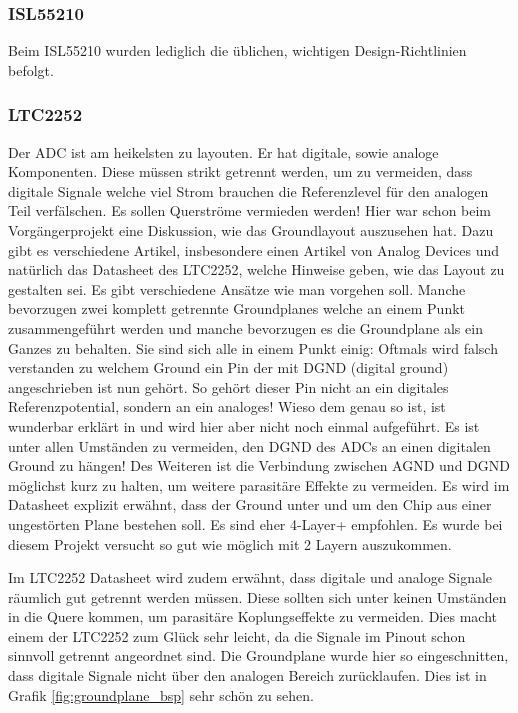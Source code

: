 \subsubsection*{ISL55210}
Beim ISL55210 wurden lediglich die üblichen, wichtigen Design-Richtlinien befolgt. 

\subsubsection*{LTC2252}
Der ADC ist am heikelsten zu layouten. Er hat digitale, sowie analoge Komponenten. Diese müssen strikt getrennt werden, um zu vermeiden, dass digitale Signale welche viel Strom brauchen die Referenzlevel für den analogen Teil verfälschen. Es sollen Querströme vermieden werden!
Hier war schon beim Vorgängerprojekt eine Diskussion, wie das Groundlayout auszusehen hat. Dazu gibt es verschiedene Artikel, insbesondere einen Artikel von Analog Devices \cite{StayingWellGrounded2012} und natürlich das Datasheet des LTC2252\cite{LTC2252}, welche Hinweise geben, wie das Layout zu gestalten sei. Es gibt verschiedene Ansätze wie man vorgehen soll. Manche bevorzugen zwei komplett getrennte Groundplanes welche an einem Punkt zusammengeführt werden und manche bevorzugen es die Groundplane als ein Ganzes zu behalten. Sie sind sich alle in einem Punkt einig: Oftmals wird falsch verstanden zu welchem Ground ein Pin der mit DGND (digital ground) angeschrieben ist nun gehört. So gehört dieser Pin nicht an ein digitales Referenzpotential, sondern an ein analoges! Wieso dem genau so ist, ist wunderbar erklärt in \cite{StayingWellGrounded2012} und wird hier aber nicht noch einmal aufgeführt.
Es ist unter allen Umständen zu vermeiden, den DGND des ADCs an einen digitalen Ground zu hängen! Des Weiteren ist die Verbindung zwischen AGND und DGND möglichst kurz zu halten, um weitere parasitäre Effekte zu vermeiden.
Es wird im Datasheet explizit erwähnt, dass der Ground unter und um den Chip aus einer ungestörten Plane bestehen soll. Es sind eher 4-Layer+ empfohlen. Es wurde bei diesem Projekt versucht so gut wie möglich mit 2 Layern auszukommen.

Im LTC2252 Datasheet wird zudem erwähnt, dass digitale und analoge Signale räumlich gut getrennt werden müssen. Diese sollten sich unter keinen Umständen in die Quere kommen, um parasitäre Koplungseffekte zu vermeiden. Dies macht einem der LTC2252 zum Glück sehr leicht, da die Signale im Pinout schon sinnvoll getrennt angeordnet sind.
Die Groundplane wurde hier so eingeschnitten, dass digitale Signale nicht über den analogen Bereich zurücklaufen. Dies ist in Grafik \ref{fig:groundplane_bsp} sehr schön zu sehen.

